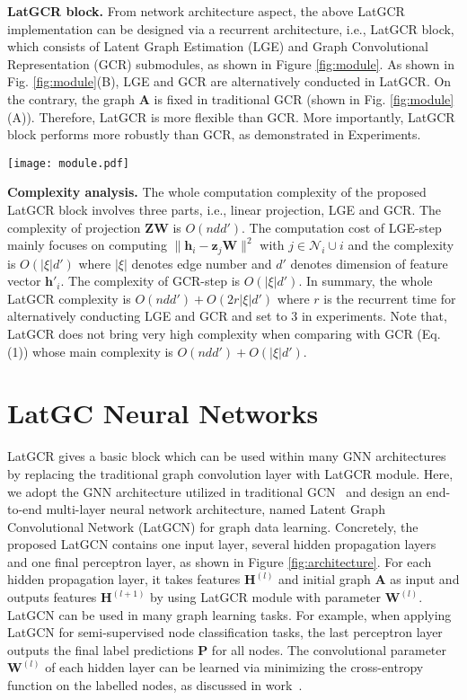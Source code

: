 \documentclass{article}
\begin{document}
\textbf{LatGCR block.} From network architecture aspect, the above LatGCR implementation can be designed
via a recurrent architecture, i.e., LatGCR block, which consists of  Latent Graph Estimation (LGE) and Graph Convolutional Representation (GCR) submodules, as shown in Figure \ref{fig:module}. 
As shown in Fig. \ref{fig:module}(B), LGE and GCR are alternatively conducted in LatGCR.
On the contrary, the graph $\mathbf{A}$ is fixed in traditional GCR (shown in Fig. \ref{fig:module}(A)). Therefore, LatGCR is more flexible than GCR.
More importantly, LatGCR block performs more robustly than GCR, as demonstrated in Experiments.

\begin{figure*}[ht]
\centering
\texttt{[image: module.pdf]}
  \caption{Architectures of  GCR and our LatGCR block.}\label{fig:module}
\end{figure*}

\textbf{Complexity analysis.}
The whole computation complexity of the proposed LatGCR block involves three parts, i.e., linear projection, LGE and GCR.
The complexity of projection $\mathbf{Z}\mathbf{W}$ is $O(ndd')$.
The computation cost of LGE-step mainly focuses on  computing $\|\mathbf{h}_i- \mathbf{z}_j\mathbf{W}\|^2$ with  $j\in \mathcal{N}_i\cup i$ and
the complexity is $O(|\xi|d')$ where $|\xi|$ denotes edge number and $d'$ denotes dimension of feature vector $\mathbf{h}'_i$.
The complexity of GCR-step is $O(|\xi|d')$.
In summary, the whole LatGCR complexity is
$O(ndd')+O(2r|\xi|d')$ where $r$ is the recurrent time for alternatively conducting LGE and GCR and set to 3 in experiments.
Note that, LatGCR does not bring very high complexity when comparing with GCR (Eq.(1)) whose main complexity is $O(ndd')+O(|\xi|d')$.



\section{LatGC Neural Networks}


LatGCR gives a basic block which can be used within many GNN architectures~\cite{DGI,graphsage,kipf2016semi} by replacing the traditional graph convolution layer with LatGCR module.
Here, we adopt the GNN architecture utilized in traditional GCN~\cite{kipf2016semi} and design an end-to-end multi-layer neural network architecture, named Latent Graph Convolutional Network (LatGCN) for graph data learning.
Concretely, the proposed LatGCN contains one input layer, several hidden propagation layers and one final perceptron layer, as shown in Figure \ref{fig:architecture}.
 For each hidden propagation layer, it takes features $\textbf{H}^{(l)}$ and initial graph $\textbf{A}$ as input and outputs features $\textbf{H}^{(l+1)}$ by using LatGCR module with  parameter $\textbf{W}^{(l)}$.
LatGCN can be used in many graph learning tasks.
For example, when applying LatGCN for semi-supervised node classification tasks, the last perceptron layer outputs the final label predictions $\mathbf{P}$ for all nodes.
 The convolutional parameter $\textbf{W}^{(l)}$ of each hidden layer can be learned via minimizing  the cross-entropy function on the labelled nodes, as discussed in work~\cite{kipf2016semi}.
\end{document}
